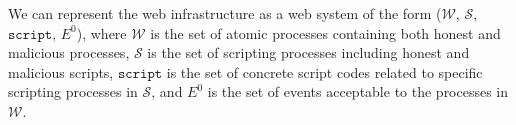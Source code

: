 \begin{comment}
\begin{definition}
\noindent\textbf{Equivalence of HTTP requests}. There are messages $m_1$ and $m_2$, we say that $m_1$ $\approx$ $m_2$ \textbf{iff} the following conditions are met,
\vspace{-\topsep}
\begin{itemize}
\setlength{\itemsep}{0pt plus 1pt}
\item If $m_1$ and $m_2$ are HTTPs requests, they are  equivalent to the observers besides of the receiver.
\item If  $m_1$ and $m_2$ are HTTPs requests, they are equivalent for the receiver \textbf{iff} the value of the Host,Path,Origin and Referer headers in both requests are same, as well as the value of the Parameters and Body are statically equivalent.
\item If  $m_1$ and $m_2$ are HTTP requests, they are equivalent to all the observers as the equivalent HTTPS requests to receivers.
\end{itemize}
\setlength{\itemsep}{0pt plus 1pt}
\label{def:httpequ}
\end{definition}
\begin{definition}
\noindent\textbf{Equivalence of events}.
There are events $e_1$ := $\langle a_1, f_1, m_1 \rangle$ and $e_2$ := $\langle a_2, f_2, m_2 \rangle$, we say that $e_1$ $\approx$ $e_2$ \textbf{iff}
\vspace{-\topsep}
\begin{itemize}
\item $a_1$ $\equiv$ $a_2$ or $a_1$ and $a_2$ belong to random addresses.
\item $f_1$ $\equiv$ $f_2$ or $f_1$ and $f_2$ belong to random addresses.
\item $m_1$ and $m_2$ are equivalent.
\end{itemize}
\label{def:eventequ}
\end{definition}
\vspace{-\topsep}
\end{comment}

 We can represent the web infrastructure as a web system of the form ($\mathcal{W}$, $\mathcal{S}$, $\mathtt{script}$, $E^0$), where $\mathcal{W}$ is the set of atomic processes containing both honest and malicious processes, $\mathcal{S}$ is the set of scripting processes including honest and malicious scripts, $\mathtt{script}$ is the set of concrete script codes related to specific scripting processes in $\mathcal{S}$, and $E^0$ is the set of events acceptable to the processes in $\mathcal{W}$.

